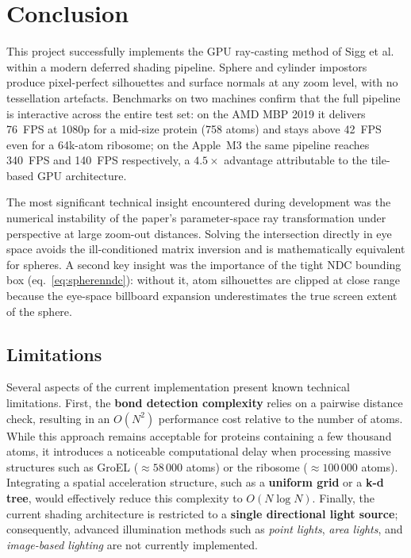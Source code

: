 \documentclass[12pt, a4paper]{article}
\begin{document}
\section{Conclusion}

This project successfully implements the GPU ray-casting method of Sigg et al.~\cite{sigg2006} within a modern deferred shading pipeline. Sphere and cylinder impostors produce pixel-perfect silhouettes and surface normals at any zoom level, with no tessellation artefacts. Benchmarks on two machines confirm that the full pipeline is interactive across the entire test set: on the AMD MBP 2019 it delivers 76~FPS at 1080p for a mid-size protein (758 atoms) and stays above 42~FPS even for a 64k-atom ribosome; on the Apple~M3 the same pipeline reaches 340~FPS and 140~FPS respectively, a $4.5\times$ advantage attributable to the tile-based GPU architecture.

The most significant technical insight encountered during development was the numerical instability of the paper's parameter-space ray transformation under perspective at large zoom-out distances. Solving the intersection directly in eye space avoids the ill-conditioned matrix inversion and is mathematically equivalent for spheres. A second key insight was the importance of the tight NDC bounding box (eq.~\ref{eq:spherenndc}): without it, atom silhouettes are clipped at close range because the eye-space billboard expansion underestimates the true screen extent of the sphere.

\subsection{Limitations}

Several aspects of the current implementation present known technical limitations. First, the \textbf{bond detection complexity} relies on a pairwise distance check, resulting in an $O(N^2)$ performance cost relative to the number of atoms. While this approach remains acceptable for proteins containing a few thousand atoms, it introduces a noticeable computational delay when processing massive structures such as GroEL ($\approx 58\,000$ atoms) or the ribosome ($\approx 100\,000$ atoms). Integrating a spatial acceleration structure, such as a \textbf{uniform grid} or a \textbf{k-d tree}, would effectively reduce this complexity to $O(N \log N)$. Finally, the current shading architecture is restricted to a \textbf{single directional light source}; consequently, advanced illumination methods such as \textit{point lights}, \textit{area lights}, and \textit{image-based lighting} are not currently implemented.
\end{document}
